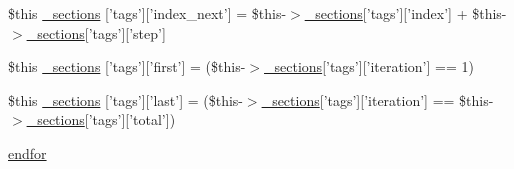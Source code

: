 \begin{DoxyCompactItemize}
\item 
\$this \hyperlink{default_234d6fa4bfd5eef6424a9ddc74a166350_2_06_06972_05_06_06972954595_05docblock_8tpl_8php_a2dedc9fb40488f277bc5fc7d3bd6ba5a}{\-\_\-sections} \mbox{[}'tags'\mbox{]}\mbox{[}'index\-\_\-next'\mbox{]} = \$this-\/$>$\hyperlink{_06_06127_05_06_0612781687_05pkgelementindex_8tpl_8php_a9e3d26b39edfe29c3f29b8035ef33828}{\-\_\-sections}\mbox{[}'tags'\mbox{]}\mbox{[}'index'\mbox{]} + \$this-\/$>$\hyperlink{_06_06127_05_06_0612781687_05pkgelementindex_8tpl_8php_a9e3d26b39edfe29c3f29b8035ef33828}{\-\_\-sections}\mbox{[}'tags'\mbox{]}\mbox{[}'step'\mbox{]}
\item 
\$this \hyperlink{default_234d6fa4bfd5eef6424a9ddc74a166350_2_06_06972_05_06_06972954595_05docblock_8tpl_8php_ae52f8d59c03dd2496b7220074afcda44}{\-\_\-sections} \mbox{[}'tags'\mbox{]}\mbox{[}'first'\mbox{]} = (\$this-\/$>$\hyperlink{_06_06127_05_06_0612781687_05pkgelementindex_8tpl_8php_a9e3d26b39edfe29c3f29b8035ef33828}{\-\_\-sections}\mbox{[}'tags'\mbox{]}\mbox{[}'iteration'\mbox{]} == 1)
\item 
\$this \hyperlink{default_234d6fa4bfd5eef6424a9ddc74a166350_2_06_06972_05_06_06972954595_05docblock_8tpl_8php_acdfe27223b28b2775a756843068c6c72}{\-\_\-sections} \mbox{[}'tags'\mbox{]}\mbox{[}'last'\mbox{]} = (\$this-\/$>$\hyperlink{_06_06127_05_06_0612781687_05pkgelementindex_8tpl_8php_a9e3d26b39edfe29c3f29b8035ef33828}{\-\_\-sections}\mbox{[}'tags'\mbox{]}\mbox{[}'iteration'\mbox{]} == \$this-\/$>$\hyperlink{_06_06127_05_06_0612781687_05pkgelementindex_8tpl_8php_a9e3d26b39edfe29c3f29b8035ef33828}{\-\_\-sections}\mbox{[}'tags'\mbox{]}\mbox{[}'total'\mbox{]})
\item 
\hyperlink{default_234d6fa4bfd5eef6424a9ddc74a166350_2_06_06972_05_06_06972954595_05docblock_8tpl_8php_ae8fdc27183f296411bac00ed522ee1ac}{endfor}
\end{DoxyCompactItemize}



